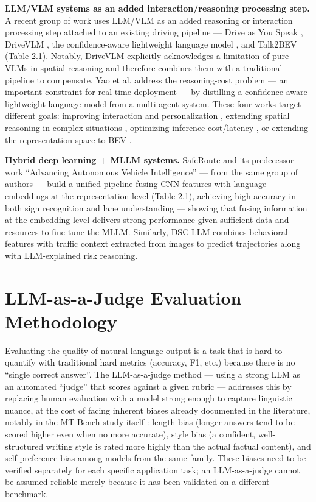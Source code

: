 \documentclass[12pt,a4paper]{report}
\begin{document}
\textbf{LLM/VLM systems as an added interaction/reasoning processing step.} A recent group of work uses LLM/VLM as an added reasoning or interaction processing step attached to an existing driving pipeline --- Drive as You Speak \cite{cui2024driveasyouspeak}, DriveVLM \cite{tian2024drivevlm}, the confidence-aware lightweight language model \cite{yao2026confidenceaware}, and Talk2BEV \cite{choudhary2024talk2bev} (Table 2.1). Notably, DriveVLM \cite{tian2024drivevlm} explicitly acknowledges a limitation of pure VLMs in spatial reasoning and therefore combines them with a traditional pipeline to compensate. Yao et al. \cite{yao2026confidenceaware} address the reasoning-cost problem --- an important constraint for real-time deployment --- by distilling a confidence-aware lightweight language model from a multi-agent system. These four works target different goals: improving interaction and personalization \cite{cui2024driveasyouspeak}, extending spatial reasoning in complex situations \cite{tian2024drivevlm}, optimizing inference cost/latency \cite{yao2026confidenceaware}, or extending the representation space to BEV \cite{choudhary2024talk2bev}.

\textbf{Hybrid deep learning + MLLM systems.} SafeRoute \cite{shaw2025saferoute} and its predecessor work ``Advancing Autonomous Vehicle Intelligence'' \cite{sah2025advancing} --- from the same group of authors --- build a unified pipeline fusing CNN features with language embeddings at the representation level (Table 2.1), achieving high accuracy in both sign recognition and lane understanding --- showing that fusing information at the embedding level delivers strong performance given sufficient data and resources to fine-tune the MLLM. Similarly, DSC-LLM \cite{kim2025dscllm} combines behavioral features with traffic context extracted from images to predict trajectories along with LLM-explained risk reasoning.

\section{LLM-as-a-Judge Evaluation Methodology}

Evaluating the quality of natural-language output is a task that is hard to quantify with traditional hard metrics (accuracy, F1, etc.) because there is no ``single correct answer''. The LLM-as-a-judge method --- using a strong LLM as an automated ``judge'' that scores against a given rubric --- addresses this by replacing human evaluation with a model strong enough to capture linguistic nuance, at the cost of facing inherent biases already documented in the literature, notably in the MT-Bench study itself \cite{zheng2023mtbench}: length bias (longer answers tend to be scored higher even when no more accurate), style bias (a confident, well-structured writing style is rated more highly than the actual factual content), and self-preference bias among models from the same family. These biases need to be verified separately for each specific application task; an LLM-as-a-judge cannot be assumed reliable merely because it has been validated on a different benchmark.
\end{document}

